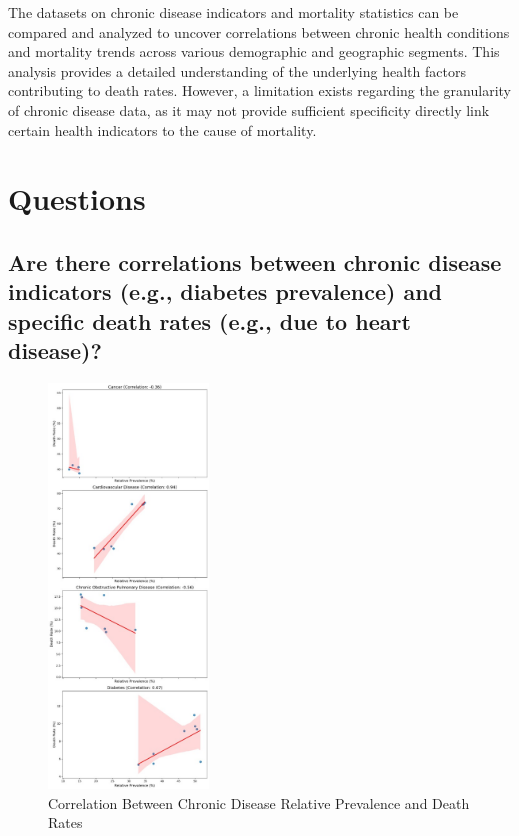 \documentclass[a4paper,10pt]{article}
\begin{document}
The datasets on chronic disease indicators and mortality statistics can be compared and analyzed to uncover correlations between chronic health conditions and mortality trends across various demographic and geographic segments. This analysis provides a detailed understanding of the underlying health factors contributing to death rates. However, a limitation exists regarding the granularity of chronic disease data, as it may not provide sufficient specificity directly link certain health indicators to the cause of mortality.






\newpage
\section{Questions}

\subsection{Are there correlations between chronic disease indicators (e.g., diabetes prevalence) and specific death rates (e.g., due to heart disease)?}

\begin{figure} %
	\centering
	\includegraphics[width=0.38\textwidth]{images/graph-1.png} %
	\caption{Correlation Between Chronic Disease Relative Prevalence and Death Rates}
	\label{fig:scatterplot}
\end{figure}
\end{document}
